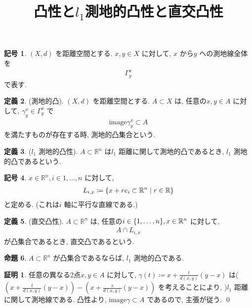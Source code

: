 \documentclass[10pt, fleqn, label-section=none]{bxjsarticle}
\title{凸性と$l_1$測地的凸性と直交凸性}
\date{}
\author{}
\theoremstyle{definition}
\newtheorem{dfn}{定義}[section]
\newtheorem{prop}[dfn]{命題}
\newtheorem{notation}[dfn]{記号}
\newtheorem*{pf*}{証明}
\newcommand{\cbra}[1]{\mleft\{#1\mright\}}
\renewcommand{\;}{\, ; \,}
\begin{document}
\maketitle

\section{}

\begin{notation}$(X, d)$ を距離空間とする. $x, y \in X$ に対して, $x$ から$y$ への測地線全体を
\begin{align*} \Gamma^x_y \end{align*}
で表す. 
\end{notation}

\begin{dfn}(測地的凸). $(X, d)$ を距離空間とする. $A \subset X$ は, 任意の$x, y \in A$ に対して, $\gamma^x_y \in \Gamma^x_y$ で
\begin{align*} \textrm{image}\gamma^x_y \subset A \end{align*}
を満たすものが存在する時, 測地的凸集合という. 
\end{dfn}

\begin{dfn}($l_1$ 測地的凸性). $A \subset \mathbb R^n$ は$l_1$ 距離に関して測地的凸であるとき, $l_1$ 測地的凸であるという. 

\end{dfn}

\begin{notation}$x \in \mathbb R^n, i \in { 1, \ldots, n}$ に対して, 
\begin{align*} L_{i,x} \coloneqq \cbra{x + r e_i \subset \mathbb R^n \mid r \in \mathbb R } \end{align*}
と定める. (これは$i$ 軸に平行な直線である.)
\end{notation}

\begin{dfn}(直交凸性). $A \subset \mathbb R^n$ は, 任意の$i \in \cbra{1, \ldots, n}, x \in \mathbb R^n$ に対して, 
\begin{align*} A \cap L_{i,x} \end{align*} 
が凸集合であるとき, 直交凸であるという. 
\end{dfn}

\begin{prop}$A \subset \mathbb R^n$ が凸集合であるならば, $l_1$ 測地的凸である. 

\end{prop}
\begin{pf*}
任意の異なる2点$x, y \in A$ に対して, $\gamma(t) \coloneqq x + \frac{t}{d(x, y)}(y-x)$ は($(x + \frac{t}{d(x, y)}(y-x) ) - (x + \frac{s}{d(x, y)}(y-x) )$ を考えることにより, )$l_1$ 距離に関して測地線である. 凸性より, 
$\textrm{image} \gamma \subset A$ であるので, 主張が従う. 
\qed
\end{pf*}
\end{document}
